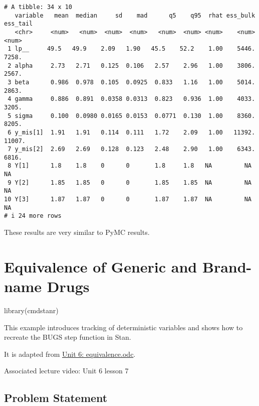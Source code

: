 \documentclass[
  letterpaper,
  DIV=11,
  numbers=noendperiod]{scrreprt}
\newenvironment{Shaded}{\begin{snugshade}}{\end{snugshade}}
\newcommand{\FunctionTok}[1]{\textcolor[rgb]{0.28,0.35,0.67}{#1}}
\newcommand{\NormalTok}[1]{\textcolor[rgb]{0.00,0.23,0.31}{#1}}
\begin{document}
\begin{verbatim}
# A tibble: 34 x 10
   variable   mean  median     sd    mad      q5    q95  rhat ess_bulk ess_tail
   <chr>     <num>   <num>  <num>  <num>   <num>  <num> <num>    <num>    <num>
 1 lp__     49.5   49.9    2.09   1.90   45.5    52.2    1.00    5446.    7258.
 2 alpha     2.73   2.71   0.125  0.106   2.57    2.96   1.00    3806.    2567.
 3 beta      0.986  0.978  0.105  0.0925  0.833   1.16   1.00    5014.    2863.
 4 gamma     0.886  0.891  0.0358 0.0313  0.823   0.936  1.00    4033.    3205.
 5 sigma     0.100  0.0980 0.0165 0.0153  0.0771  0.130  1.00    8360.    8205.
 6 y_mis[1]  1.91   1.91   0.114  0.111   1.72    2.09   1.00   11392.   11007.
 7 y_mis[2]  2.69   2.69   0.128  0.123   2.48    2.90   1.00    6343.    6816.
 8 Y[1]      1.8    1.8    0      0       1.8     1.8   NA         NA       NA 
 9 Y[2]      1.85   1.85   0      0       1.85    1.85  NA         NA       NA 
10 Y[3]      1.87   1.87   0      0       1.87    1.87  NA         NA       NA 
# i 24 more rows
\end{verbatim}

These results are very similar to PyMC results.

\hypertarget{equivalence-of-generic-and-brand-name-drugs}{%
\chapter*{Equivalence of Generic and Brand-name
Drugs}\label{equivalence-of-generic-and-brand-name-drugs}}


\begin{Shaded}
\begin{Highlighting}[]
\FunctionTok{library}\NormalTok{(cmdstanr)}
\end{Highlighting}
\end{Shaded}

This example introduces tracking of deterministic variables and shows
how to recreate the BUGS step function in Stan.

It is adapted from \href{../odc_files/unit6/equivalence.odc}{Unit 6:
equivalence.odc}.

Associated lecture video: Unit 6 lesson 7

\hypertarget{problem-statement-2}{%
\section*{Problem Statement}\label{problem-statement-2}}
\end{document}
